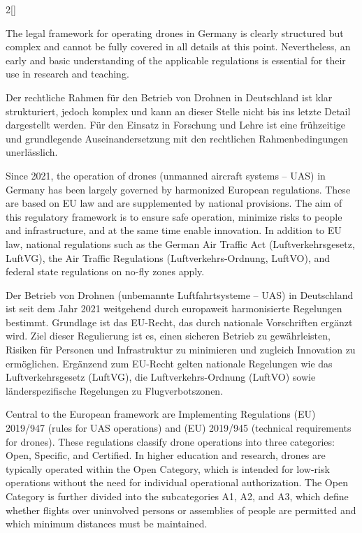 \begin{paracol}{2}[]
\colende

\renewcommand{\deutschertitel}{Situation in Deutschland}
\renewcommand{\englischertitel}{Situation in Germany}
\makroabschnitt
\label{AbschnittRegulatorischeGrundlagenDeutschland}

The legal framework for operating drones in Germany is clearly structured but complex and cannot be fully covered in all details at this point. Nevertheless, an early and basic understanding of the applicable regulations is essential for their use in research and teaching.

\colger

Der rechtliche Rahmen für den Betrieb von Drohnen in Deutschland ist klar strukturiert, jedoch komplex und kann an dieser Stelle nicht bis ins letzte Detail dargestellt werden. Für den Einsatz in Forschung und Lehre ist eine frühzeitige und grundlegende Auseinandersetzung mit den rechtlichen Rahmenbedingungen unerlässlich.

\coleng

Since 2021, the operation of drones (unmanned aircraft systems -- UAS) in Germany has been largely governed by harmonized European regulations. These are based on EU law and are supplemented by national provisions. The aim of this regulatory framework is to ensure safe operation, minimize risks to people and infrastructure, and at the same time enable innovation. In addition to EU law, national regulations such as the German Air Traffic Act (Luftverkehrsgesetz, LuftVG), the Air Traffic Regulations (Luftverkehrs-Ordnung, LuftVO), and federal state regulations on no-fly zones apply.

\colger

Der Betrieb von Drohnen (unbemannte Luftfahrtsysteme -- UAS) in Deutschland ist seit dem Jahr 2021 weitgehend durch europaweit harmonisierte Regelungen bestimmt. Grundlage ist das EU-Recht, das durch nationale Vorschriften ergänzt wird. Ziel dieser Regulierung ist es, einen sicheren Betrieb zu gewährleisten, Risiken für Personen und Infrastruktur zu minimieren und zugleich Innovation zu ermöglichen. Ergänzend zum EU-Recht gelten nationale Regelungen wie das Luftverkehrsgesetz (LuftVG), die Luftverkehrs-Ordnung (LuftVO) sowie länderspezifische Regelungen zu Flugverbotszonen.

\coleng

Central to the European framework are Implementing Regulations (EU) 2019/947 (rules for UAS operations) and (EU) 2019/945 (technical requirements for drones). These regulations classify drone operations into three categories: Open, Specific, and Certified. In higher education and research, drones are typically operated within the Open Category, which is intended for low-risk operations without the need for individual operational authorization. The Open Category is further divided into the subcategories A1, A2, and A3, which define whether flights over uninvolved persons or assemblies of people are permitted and which minimum distances must be maintained.


\end{paracol}
